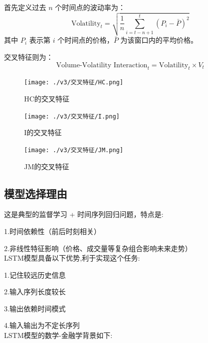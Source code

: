 \documentclass[a4paper,11pt]{ctexart}
\begin{document}
首先定义过去 $n$ 个时间点的波动率为：
\[
\text{Volatility}_t = \sqrt{\frac{1}{n} \sum_{i=t-n+1}^{t} (P_i - \bar{P})^2}
\]
其中 $P_i$ 表示第 $i$ 个时间点的价格，$\bar{P}$ 为该窗口内的平均价格。

交叉特征则为：
\[
\text{Volume-Volatility Interaction}_t = \text{Volatility}_t \times V_t
\]
\FloatBarrier
\noindent
  \begin{figure}[H]
  \centering

    \texttt{[image: ./v3/交叉特征/HC.png]}
    \caption*{HC的交叉特征}
  \end{figure}
  \begin{figure}[H]
    \centering
    \texttt{[image: ./v3/交叉特征/I.png]}
    \caption*{I的交叉特征}
  \end{figure}
  \begin{figure}[H]
    \centering
    \texttt{[image: ./v3/交叉特征/JM.png]}
    \caption*{JM的交叉特征}
 
  \end{figure}



\subsection{模型选择理由}

这是典型的监督学习 + 时间序列回归问题，特点是:

1.时间依赖性（前后时刻相关）

2.非线性特征影响（价格、成交量等复杂组合影响未来走势）\\

LSTM模型具备以下优势,利于实现这个任务:

1.记住较远历史信息

2.输入序列长度较长

3.输出依赖时间模式

4.输入输出为不定长序列\\

LSTM模型的数学-金融学背景如下:
\end{document}
